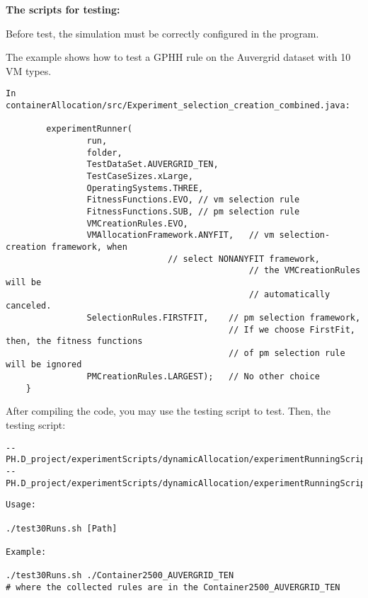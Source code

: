 \begin{flushleft}\textbf{The scripts for testing:}\end{flushleft}
Before test, the simulation must be correctly configured in the program.


\begin{flushleft}The example shows how to test a GPHH rule on the Auvergrid dataset with 10 VM types.\end{flushleft}
\begin{lstlisting}
In containerAllocation/src/Experiment_selection_creation_combined.java:

        experimentRunner(
                run,
                folder,
                TestDataSet.AUVERGRID_TEN,
                TestCaseSizes.xLarge,
                OperatingSystems.THREE,
                FitnessFunctions.EVO, // vm selection rule
                FitnessFunctions.SUB, // pm selection rule
                VMCreationRules.EVO,
                VMAllocationFramework.ANYFIT, 	// vm selection-creation framework, when 
                				// select NONANYFIT framework,
                                                // the VMCreationRules will be 
                                                // automatically canceled.
                SelectionRules.FIRSTFIT, 	// pm selection framework,
                                        	// If we choose FirstFit, then, the fitness functions 
                                        	// of pm selection rule will be ignored
                PMCreationRules.LARGEST); 	// No other choice
    }
\end{lstlisting}

\begin{flushleft}After compiling the code, you may use the testing script to test.
Then, the testing script:\end{flushleft}

\begin{lstlisting}
--PH.D_project/experimentScripts/dynamicAllocation/experimentRunningScripts/runSingleExperiment.sh
--PH.D_project/experimentScripts/dynamicAllocation/experimentRunningScripts/test30Runs.sh
\end{lstlisting}


\begin{lstlisting}
Usage:

./test30Runs.sh [Path]

Example:

./test30Runs.sh ./Container2500_AUVERGRID_TEN  
# where the collected rules are in the Container2500_AUVERGRID_TEN
\end{lstlisting}


